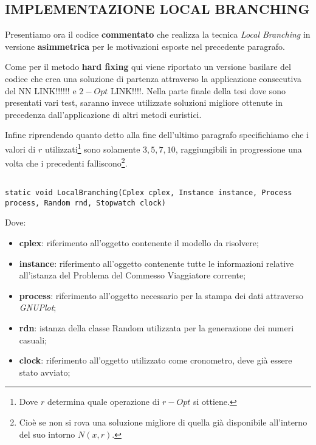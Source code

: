 \documentclass[11pt]{article}
\begin{document}
\subsection*{IMPLEMENTAZIONE LOCAL BRANCHING}
\label{sec:ImplementazioneLocalBranchS}

Presentiamo ora il codice \textbf{commentato} che realizza la tecnica \textit{Local Branching} in versione \textbf{asimmetrica} per le motivazioni esposte nel precedente paragrafo.

Come per il metodo \textbf{hard fixing} qui viene riportato un versione basilare del codice che crea una soluzione di partenza attraverso la applicazione consecutiva del NN LINK!!!!!! e $2-Opt$ LINK!!!!. Nella parte finale della tesi dove sono presentati vari test, saranno invece utilizzate soluzioni migliore ottenute in precedenza dall'applicazione di altri metodi euristici.

Infine riprendendo quanto detto alla fine dell'ultimo paragrafo specifichiamo che i valori di $r$ utilizzati\footnote{Dove $r$ determina quale operazione di $r-Opt$ si ottiene.} sono solamente ${3, 5, 7, 10}$, raggiungibili in progressione una volta che i precedenti falliscono\footnote{Cioè se non si rova una soluzione migliore di quella già disponibile all'interno del suo intorno $N(x,r)$.}.

\begin{lstlisting}

static void LocalBranching(Cplex cplex, Instance instance, Process process, Random rnd, Stopwatch clock)

\end{lstlisting}

Dove:

\begin{itemize}
    \item \textbf{cplex}: riferimento all'oggetto contenente il modello da risolvere;
    \item \textbf{instance}: riferimento all'oggetto contenente tutte le informazioni relative all'istanza del Problema del Commesso Viaggiatore corrente;
    \item \textbf{process}: riferimento all'oggetto necessario per la stampa dei dati attraverso \textit{GNUPlot};
    \item \textbf{rdn}: istanza della classe Random utilizzata per la generazione dei numeri casuali;
    \item \textbf{clock}: riferimento all'oggetto utilizzato come cronometro, deve già essere stato avviato;
\end{itemize}
\end{document}
